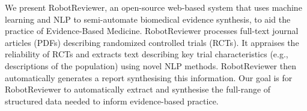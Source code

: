 We present RobotReviewer, an open-source web-based system that uses machine learning and NLP to semi-automate biomedical evidence synthesis, to aid the practice of Evidence-Based Medicine. RobotReviewer processes full-text journal articles (PDFs) describing randomized controlled trials (RCTs). It appraises the reliability of RCTs and extracts text describing key trial characteristics (e.g., descriptions of the population) using novel NLP methods. RobotReviewer then automatically generates a report synthesising this information. Our goal is for RobotReviewer to automatically extract and synthesise the full-range of structured data needed to inform evidence-based practice.
